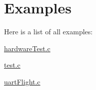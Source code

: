 \section{Examples}
Here is a list of all examples\-:\begin{DoxyCompactItemize}
\item 
\hyperlink{hardware_test_8c-example}{hardware\-Test.\-c}
\item 
\hyperlink{test_8c-example}{test.\-c}
\item 
\hyperlink{uart_flight_8c-example}{uart\-Flight.\-c}
\end{DoxyCompactItemize}
